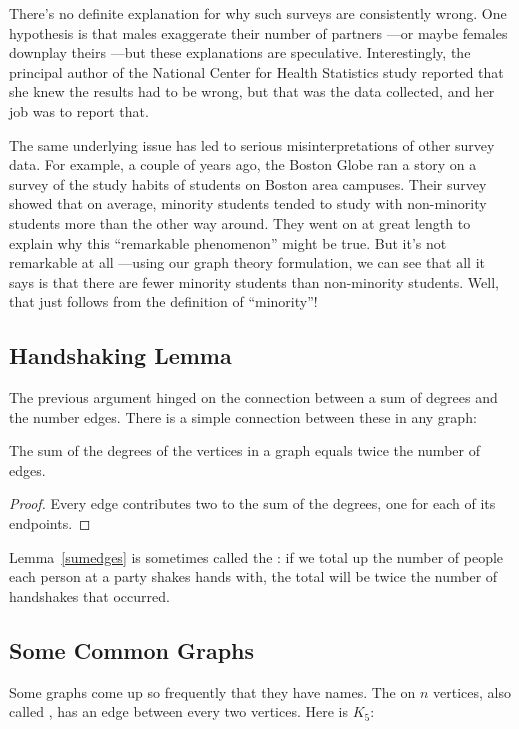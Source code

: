 There's no definite explanation for why such surveys are consistently
wrong.  One hypothesis is that males exaggerate their number of partners
---or maybe females downplay theirs ---but these explanations are
speculative.  Interestingly, the principal author of the National Center
for Health Statistics study reported that she knew the results had to be
wrong, but that was the data collected, and her job was to report that.

The same underlying issue has led to serious misinterpretations of other
survey data.  For example, a couple of years ago, the Boston Globe ran a
story on a survey of the study habits of students on Boston area campuses.
Their survey showed that on average, minority students tended to study
with non-minority students more than the other way around.  They went on
at great length to explain why this ``remarkable phenomenon'' might be
true.  But it's not remarkable at all ---using our graph theory
formulation, we can see that all it says is that there are fewer minority
students than non-minority students.  Well, that just follows from the
definition of ``minority''!

\subsection{Handshaking Lemma}
The previous argument hinged on the connection between a sum of degrees
and the number edges.  There is a simple connection between these in any
graph:

\begin{lemma}\label{sumedges}
The sum of the degrees of the vertices in a graph equals twice the number
of edges.
\end{lemma}

\begin{proof}
Every edge contributes two to the sum of the degrees, one for each of its
endpoints.
\end{proof}

Lemma~\ref{sumedges} is sometimes called the :
if we total up the number of people each person at a party shakes hands
with, the total will be twice the number of handshakes that occurred.

\subsection{Some Common Graphs}
Some graphs come up so frequently that they have names.  The
 on $n$ vertices, also called , has an edge
between every two vertices.  Here is $K_5$:

